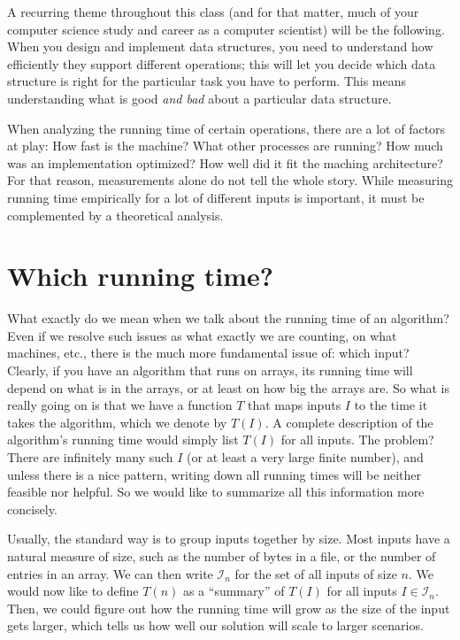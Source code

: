 A recurring theme throughout this class (and for that matter, much of
your computer science study and career as a computer scientist) will be the following.
When you design and implement data structures, you need to understand
how efficiently they support different operations; this will let you
decide which data structure is right for the particular task you have
to perform. This means understanding what is good \emph{and bad} about
a particular data structure.

When analyzing the running time of certain operations, there are a lot
of factors at play: How fast is the machine? What other processes are
running? How much was an implementation optimized? How well did it fit
the maching architecture?
For that reason, measurements alone do not tell the whole story.
While measuring running time empirically for a lot of different inputs
is important, it must be complemented by a theoretical analysis.

\section{Which running time?}
What exactly do we mean when we talk about the running time of an
algorithm?
Even if we resolve such issues as what exactly we are counting, on
what machines, etc., there is the much more fundamental issue of: which input?
Clearly, if you have an algorithm that runs on arrays, its running
time will depend on what is in the arrays, or at least on how big the
arrays are.
So what is really going on is that we have a function $T$ that maps
inputs $I$ to the time it takes the algorithm, which we denote by $T(I)$. 
A complete description of the algorithm's running time would simply
list $T(I)$ for all inputs.
The problem? There are infinitely many such $I$ (or at least a very
large finite number), and unless there is a nice pattern,
writing down all running times will be neither feasible nor helpful.
So we would like to summarize all this information more concisely.

Usually, the standard way is to group inputs together by size.
Most inputs have a natural measure of size, such as the number of
bytes in a file, or the number of entries in an array.
We can then write $\mathcal{I}_n$ for the set of all inputs of size
$n$. We would now like to define $T(n)$ as a ``summary'' of $T(I)$
for all inputs $I \in \mathcal{I}_n$.
Then, we could figure out how the running time will grow as the size
of the input gets larger,
which tells us how well our solution will scale to larger scenarios.

